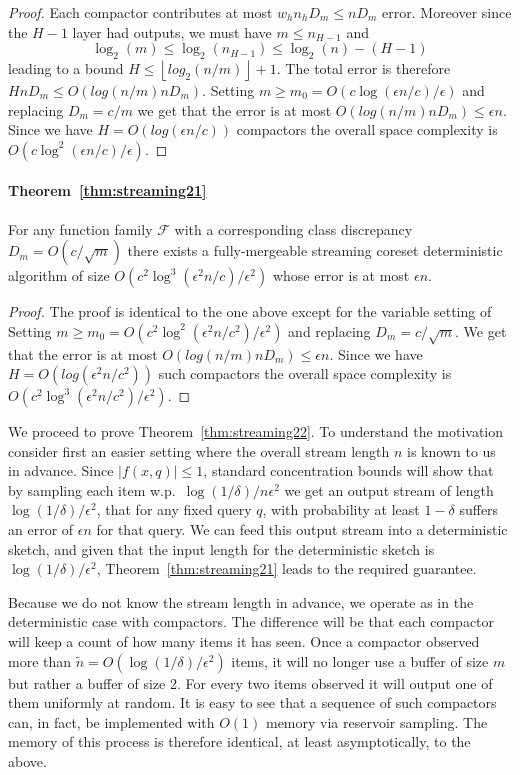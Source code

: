 \documentclass[12pt]{colt2019} %
\newcommand{\eps}{\epsilon}
\newcommand{\F}{\mathcal{F}}
\newcommand{\floor}[1]{\left \lfloor #1 \right \rfloor}
\begin{document}
{\begin{proof}
Each compactor contributes at most $w_h n_h D_m \le n D_m$ error. Moreover since the $H-1$ layer had outputs, we must have $m \leq n_{H-1}$ and
$$  \log_2(m) \leq \log_2(n_{H-1}) \leq \log_2(n) - (H-1)$$
leading to a bound $H \le \floor{log_2(n/m)}+1$.
The total error is therefore $H n D_m \le O(log(n/m) n D_m)$. 
Setting $m \ge m_0 = O(c\log(\eps n/c)/\eps)$ and replacing $D_m = c/m$ we get that the error is at most $O(log(n/m) n D_m) \le \eps n$.
Since we have $H = O(log(\eps n/c))$ compactors the overall space complexity is $O(c\log^2(\eps n/c)/\eps)$. 
\end{proof}

\paragraph{Theorem~\ref{thm:streaming21}}
For any function family $\F$ with a corresponding class discrepancy $D_m = O(c/\sqrt{m})$ there exists a fully-mergeable streaming coreset deterministic algorithm of size $O\left(c^2\log^3(\eps^2 n/c) /\eps^2\right)$ whose error is at most $\eps n$. 
\begin{proof}
The proof is identical to the one above except for the variable setting of
Setting $m \ge m_0 = O(c^2\log^2(\eps^2 n/c^2)/\eps^2)$ and replacing $D_m = c/\sqrt{m}$. 
We get that the error is at most $O(log(n/m) n D_m) \le \eps n$. 
Since we have $H = O(log(\eps^2 n/c^2))$ such compactors the overall space complexity is $O\left(c^2\log^3(\eps^2 n/c^2) /\eps^2\right)$. 
\end{proof}

We proceed to prove Theorem~\ref{thm:streaming22}. To understand the motivation consider first an easier setting where the overall stream length $n$ is known to us in advance. Since $|f(x,q)| \leq 1$, standard concentration bounds will show that by sampling each item w.p.\ $\log(1/\delta)/n\eps^2$ we get an output stream of length $\log(1/\delta)/\eps^2$, that for any fixed query $q$, with probability at least $1-\delta$ suffers an error of $\eps n$ for that query. We can feed this output stream into a deterministic sketch, and given that the input length for the deterministic sketch is $\log(1/\delta)/\eps^2$, Theorem~\ref{thm:streaming21} leads to the required guarantee.

Because we do not know the stream length in advance, we operate as in the deterministic case with compactors. The difference will be that each compactor will keep a count of how many items it has seen. Once a compactor observed more than $\tilde{n} = O(\log(1/\delta)/\eps^2)$ items, it will no longer use a buffer of size $m$ but rather a buffer of size 2. For every two items observed it will output one of them uniformly at random. It is easy to see that a sequence of such compactors can, in fact, be implemented with $O(1)$ memory via reservoir sampling. 
The memory of this process is therefore identical, at least asymptotically, to the above.

}
\end{document}
